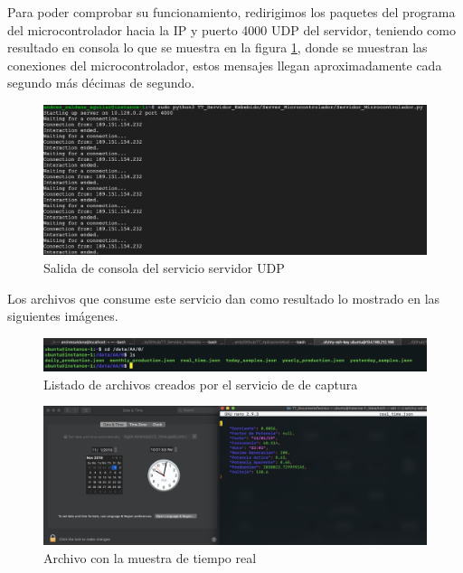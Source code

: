 Para poder comprobar su funcionamiento, redirigimos los paquetes del programa del microcontrolador hacia la IP y puerto 4000 UDP del servidor, teniendo como resultado en consola lo que se muestra en la figura \ref{fig:consola server udp}, donde se muestran las conexiones del microcontrolador, estos mensajes llegan aproximadamente cada segundo más décimas de segundo.

\begin{figure}[H]
	\centering
	\includegraphics[scale=.3]{Capitulo5/images/udp_server_console.png}
	\caption{Salida de consola del servicio servidor UDP}
	\label{fig:consola server udp}
\end{figure} 

Los archivos que consume este servicio dan como resultado lo mostrado en las siguientes imágenes.

\begin{figure}[H]
	\centering
	\includegraphics[scale=.3]{Capitulo5/images/dirlist.png}
	\caption{Listado de archivos creados por el servicio de de captura}
	\label{fig:}
\end{figure} 

\begin{figure}[H]
	\centering
	\includegraphics[scale=.3]{Capitulo5/images/real_time.png}
	\caption{Archivo con la muestra de tiempo real}
	\label{fig:}
\end{figure} 

